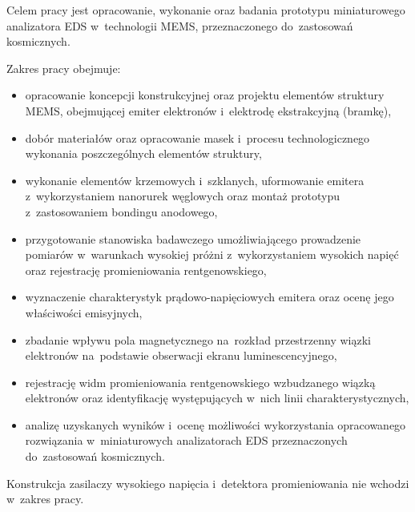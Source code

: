 \label{sec:cel}
Celem pracy jest opracowanie, wykonanie oraz badania prototypu
miniaturowego analizatora EDS w~technologii MEMS, przeznaczonego
do~zastosowań kosmicznych.
\begin{zmiana}
Zakres pracy obejmuje:
\begin{itemize}
  \item opracowanie koncepcji konstrukcyjnej oraz projektu elementów
    struktury MEMS, obejmującej emiter elektronów i~elektrodę
    ekstrakcyjną (bramkę),
  \item dobór materiałów oraz opracowanie masek i~procesu
    technologicznego wykonania poszczególnych elementów struktury,
  \item wykonanie elementów krzemowych i~szklanych, uformowanie emitera
    z~wykorzystaniem nanorurek węglowych oraz montaż prototypu
    z~zastosowaniem bondingu anodowego,
  \item przygotowanie stanowiska badawczego umożliwiającego prowadzenie
    pomiarów w~warunkach wysokiej próżni z~wykorzystaniem wysokich
    napięć oraz rejestrację promieniowania rentgenowskiego,
  \item wyznaczenie charakterystyk prądowo-napięciowych emitera oraz
    ocenę jego właściwości emisyjnych,
  \item zbadanie wpływu pola magnetycznego na~rozkład przestrzenny wiązki
    elektronów na~podstawie obserwacji ekranu luminescencyjnego,
  \item rejestrację widm promieniowania rentgenowskiego wzbudzanego
    wiązką elektronów oraz identyfikację występujących w~nich linii
    charakterystycznych,
  \item analizę uzyskanych wyników i~ocenę możliwości wykorzystania
    opracowanego rozwiązania w~miniaturowych analizatorach EDS
    przeznaczonych do~zastosowań kosmicznych.
\end{itemize}

Konstrukcja zasilaczy wysokiego napięcia i~detektora promieniowania
nie wchodzi w~zakres pracy.
\end{zmiana}
